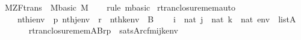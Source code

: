 \begin{isabellebody}
\isanewline
{}\isamarkupfalse%
\ M{\isacharunderscore}{\kern0pt}ZF{\isacharunderscore}{\kern0pt}trans\ {\isasymsubseteq}\ M{\isacharunderscore}{\kern0pt}basic\ {\isachardoublequoteopen}{\isacharhash}{\kern0pt}{\isacharhash}{\kern0pt}M{\isachardoublequoteclose}\isanewline
%
\isadelimproof
\ \ %
\endisadelimproof
%
\isatagproof
{}\isamarkupfalse%
\ {\isacharparenleft}{\kern0pt}rule\ mbasic{\isacharparenright}{\kern0pt}%
\endisatagproof
{\isafoldproof}%
%
\isadelimproof
%
\endisadelimproof
%
\isadelimdocument
%
\endisadelimdocument
%
\isatagdocument
%
\isamarkuptrue%
%
\endisatagdocument
{\isafolddocument}%
%
\isadelimdocument
%
\endisadelimdocument
{}\isamarkupfalse%
\ rtran{\isacharunderscore}{\kern0pt}closure{\isacharunderscore}{\kern0pt}mem{\isacharunderscore}{\kern0pt}auto{\isacharcolon}{\kern0pt}\isanewline
\ \ \isanewline
\ \ \ \ {\isachardoublequoteopen}nth{\isacharparenleft}{\kern0pt}i{\isacharcomma}{\kern0pt}env{\isacharparenright}{\kern0pt}\ {\isacharequal}{\kern0pt}\ p{\isachardoublequoteclose}\ {\isachardoublequoteopen}nth{\isacharparenleft}{\kern0pt}j{\isacharcomma}{\kern0pt}env{\isacharparenright}{\kern0pt}\ {\isacharequal}{\kern0pt}\ r{\isachardoublequoteclose}\ \ {\isachardoublequoteopen}nth{\isacharparenleft}{\kern0pt}k{\isacharcomma}{\kern0pt}env{\isacharparenright}{\kern0pt}\ {\isacharequal}{\kern0pt}\ B{\isachardoublequoteclose}\isanewline
\ \ \ \ {\isachardoublequoteopen}i\ {\isasymin}\ nat{\isachardoublequoteclose}\ {\isachardoublequoteopen}j\ {\isasymin}\ nat{\isachardoublequoteclose}\ {\isachardoublequoteopen}k\ {\isasymin}\ nat{\isachardoublequoteclose}\ {\isachardoublequoteopen}env\ {\isasymin}\ list{\isacharparenleft}{\kern0pt}A{\isacharparenright}{\kern0pt}{\isachardoublequoteclose}\isanewline
\ \ \isanewline
\ \ \ \ {\isachardoublequoteopen}rtran{\isacharunderscore}{\kern0pt}closure{\isacharunderscore}{\kern0pt}mem{\isacharparenleft}{\kern0pt}{\isacharhash}{\kern0pt}{\isacharhash}{\kern0pt}A{\isacharcomma}{\kern0pt}B{\isacharcomma}{\kern0pt}r{\isacharcomma}{\kern0pt}p{\isacharparenright}{\kern0pt}\ {\isasymlongleftrightarrow}\ sats{\isacharparenleft}{\kern0pt}A{\isacharcomma}{\kern0pt}{\isacharquery}{\kern0pt}rcfm{\isacharparenleft}{\kern0pt}i{\isacharcomma}{\kern0pt}j{\isacharcomma}{\kern0pt}k{\isacharparenright}{\kern0pt}{\isacharcomma}{\kern0pt}env{\isacharparenright}{\kern0pt}{\isachardoublequoteclose}\isanewline
%
\isadelimproof

\end{isabellebody}
